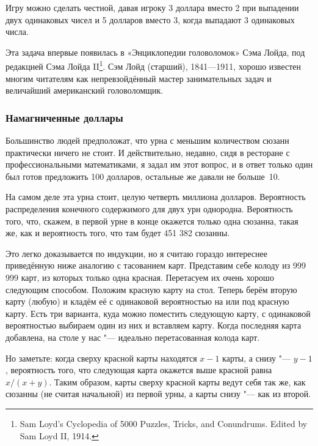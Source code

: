 \documentclass[twoside]{book}
\begin{document}
\medskip

Игру можно сделать честной, давая игроку 3 доллара вместо 2 при выпадении двух одинаковых чисел 
и 5 долларов вместо 3, когда выпадают 3 одинаковых числа.

\medskip

Эта задача впервые появилась в «Энциклопедии головоломок» Сэма Лойда, под редакцией Сэма Лойда II\footnote{{Sam Loyd’s Cyclopedia of 5000 Puzzles, Tricks, and Conundrums.} Edited by Sam Loyd II, 1914.}.
Сэм Лойд (старший), 1841---1911, хорошо известен многим читателям как непревзойдённый мастер занимательных задач и величайший американский головоломщик.

\subsubsection*{Намагниченные доллары}%

Большинство людей предположат, что урна с меньшим количеством сюзанн практически ничего не стоит.
И действительно, недавно, сидя в ресторане с профессиональными математиками, я задал им этот вопрос, и в ответ только один был готов предложить 100 долларов, остальные же давали не больше~10.

На самом деле эта урна стоит,  целую четверть миллиона долларов.
Вероятность распределения конечного содержимого для двух урн однородна.
Вероятность того, что, скажем, в первой урне в конце окажется только одна сюзанна, такая же, как и вероятность того, что там будет 451 382 сюзанны.

Это легко доказывается по индукции, но я считаю гораздо интереснее приведённую ниже аналогию с тасованием карт.
Представим себе колоду из 
999 999 
карт, из которых только одна красная.
Перетасуем их очень хорошо следующим способом.
Положим красную карту на стол.
Теперь берём вторую карту (любую) и кладём её с одинаковой вероятностью на или под красную карту.
Есть три варианта, куда можно поместить следующую карту, с одинаковой вероятностью выбираем один из них и вставляем карту.
Когда последняя карта добавлена, на столе у нас "--- идеально перетасованная колода карт.

Но заметьте: когда сверху красной карты находятся $x-1$ карты, а снизу "--- $y-1$, вероятность того, что следующая карта окажется выше красной равна $x/(x+y)$.
Таким образом, карты сверху красной карты ведут себя так же, как сюзанны (не считая начальной) из первой урны, а карты снизу "--- как из второй.
\end{document}
